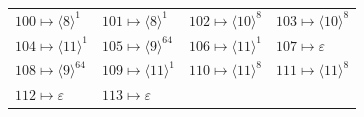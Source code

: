 {\begin{longtable}{@{}llll@{}}
\(100\mapsto \langle 8\rangle^{1}\) & \(101\mapsto \langle 8\rangle^{1}\) & \(102\mapsto \langle 10\rangle^{8}\) & \(103\mapsto \langle 10\rangle^{8}\)\\
\(104\mapsto \langle 11\rangle^{1}\) & \(105\mapsto \langle 9\rangle^{64}\) & \(106\mapsto \langle 11\rangle^{1}\) & \(107\mapsto \varepsilon\)\\
\(108\mapsto \langle 9\rangle^{64}\) & \(109\mapsto \langle 11\rangle^{1}\) & \(110\mapsto \langle 11\rangle^{8}\) & \(111\mapsto \langle 11\rangle^{8}\)\\
\(112\mapsto \varepsilon\) & \(113\mapsto \varepsilon\) &  & \\
\end{longtable}}
